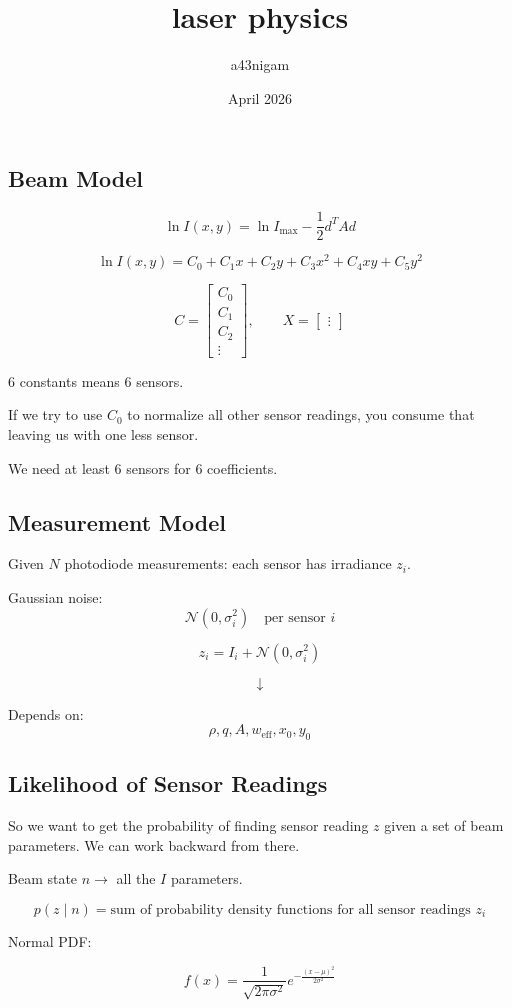 \documentclass[12pt]{article}
\title{laser physics}
\author{a43nigam }
\date{April 2026}
\begin{document}
\subsection{Beam Model}

\[
\ln I(x,y)
=
\ln I_{\max}
-
\frac{1}{2}d^T A d
\]

\[
\ln I(x,y)
=
C_0
+
C_1x
+
C_2y
+
C_3x^2
+
C_4xy
+
C_5y^2
\]

\[
C=
\begin{bmatrix}
C_0\\
C_1\\
C_2\\
\vdots
\end{bmatrix},
\qquad
X=
\begin{bmatrix}
\vdots
\end{bmatrix}
\]

6 constants means 6 sensors.

If we try to use \(C_0\) to normalize all other sensor readings, you consume that leaving us with one less sensor.

We need at least 6 sensors for 6 coefficients.

\subsection{Measurement Model}

Given \(N\) photodiode measurements: each sensor has irradiance \(z_i\).

Gaussian noise:
\[
\mathcal{N}(0,\sigma_i^2)
\quad \text{per sensor } i
\]

\[
z_i = I_i + \mathcal{N}(0,\sigma_i^2)
\]

\[
\downarrow
\]

Depends on:
\[
\rho, q, A, w_{\text{eff}}, x_0, y_0
\]

\subsection{Likelihood of Sensor Readings}

So we want to get the probability of finding sensor reading \(z\) given a set of beam parameters. We can work backward from there.

Beam state \(n\rightarrow\) all the \(I\) parameters.

\[
p(z\mid n)
=
\text{sum of probability density functions for all sensor readings } z_i
\]

Normal PDF:

\[
f(x)
=
\frac{1}{\sqrt{2\pi\sigma^2}}
e^{-\frac{(x-\mu)^2}{2\sigma^2}}
\]
\end{document}
